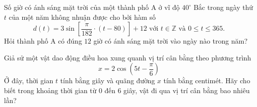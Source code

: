 \begin{bt}%
	Số giờ có ánh sáng mặt trời của một thành phố A ở vĩ độ $40^\circ$ Bắc trong ngày thứ $t$ của một năm không nhuận được cho bởi hàm số
	$$d(t) = 3\sin \left[ \dfrac{\pi}{182} \cdot (t - 80)\right]  + 12 \text{ với }t\in \mathbb{Z} \text{ và } 0 \le t \le 365.$$
	Hỏi thành phố A có đúng $12$ giờ có ánh sáng mặt trời vào ngày nào trong năm?
\end{bt}


\begin{bt}%
	Giả sử một vật dao động điều hoa xung quanh vị trí cân bằng theo phương trình $$x=2\cos\left(5t-\dfrac{\pi}{6} \right) $$ Ở đây, thời gian $t$ tính bằng giây và quãng đường $x$ tính bằng centimét. Hãy cho biết trong khoảng thời gian từ $0$ đến $6$ giây, vật đi qua vị trí cân bằng bao nhiêu lần?
\end{bt}








